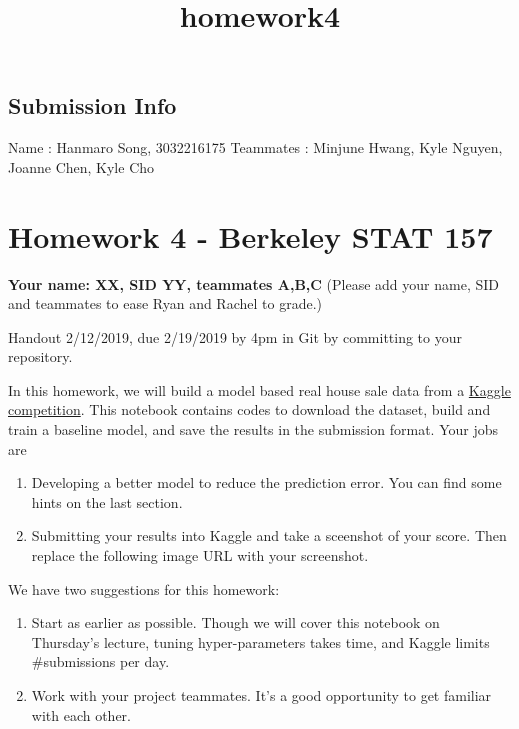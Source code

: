 \documentclass[11pt]{article}
\title{homework4}
\providecommand{\tightlist}{%
      \setlength{\itemsep}{0pt}\setlength{\parskip}{0pt}}
\begin{document}
    
    
    \maketitle
    
    

    
    \hypertarget{submission-info}{%
\subsection{Submission Info}\label{submission-info}}

    Name : Hanmaro Song, 3032216175 Teammates : Minjune Hwang, Kyle Nguyen,
Joanne Chen, Kyle Cho

    \hypertarget{homework-4---berkeley-stat-157}{%
\section{Homework 4 - Berkeley STAT
157}\label{homework-4---berkeley-stat-157}}

\textbf{Your name: XX, SID YY, teammates A,B,C} (Please add your name,
SID and teammates to ease Ryan and Rachel to grade.)

Handout 2/12/2019, due 2/19/2019 by 4pm in Git by committing to your
repository.

In this homework, we will build a model based real house sale data from
a
\href{https://www.kaggle.com/c/house-prices-advanced-regression-techniques}{Kaggle
competition}. This notebook contains codes to download the dataset,
build and train a baseline model, and save the results in the submission
format. Your jobs are

\begin{enumerate}
\def\labelenumi{\arabic{enumi}.}
\item
  Developing a better model to reduce the prediction error. You can find
  some hints on the last section.
\item
  Submitting your results into Kaggle and take a sceenshot of your
  score. Then replace the following image URL with your screenshot.
\end{enumerate}

We have two suggestions for this homework:

\begin{enumerate}
\def\labelenumi{\arabic{enumi}.}
\tightlist
\item
  Start as earlier as possible. Though we will cover this notebook on
  Thursday's lecture, tuning hyper-parameters takes time, and Kaggle
  limits \#submissions per day.
\item
  Work with your project teammates. It's a good opportunity to get
  familiar with each other.
\end{enumerate}
\end{document}
